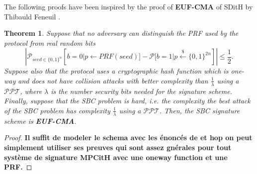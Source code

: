 \documentclass[english]{article}
\newtheorem{theorem}{Theorem}[section]
\begin{document}
	The following proofs have been inspired by the proof of \textbf{EUF-CMA} of SDitH by Thibauld Feneuil \cite{feneu2023}.
	
	\begin{theorem}
		Suppose that no adversary can distinguish the PRF used by the protocol from real random bits
		$$
		| \mathcal{P}_{seed \in \{0,1\}^n}[b=0 | p \leftarrow PRF(seed)] - \mathcal{P}[b=1 | p \overset{{\scriptscriptstyle\$}}{\leftarrow} \{0,1\}^{2n}] | \leq \frac{1}{2}.
		$$
		Suppose also that the protocol uses a cryptographic hash function which is one-way and does not have collision attacks with better complexity than $\frac{1}{\lambda}$ using a $\mathcal{PPT}$, where $\lambda$ is the number security bits needed for the signature scheme.
		Finally, suppose that the SBC problem is hard, i.e. the complexity the best attack of the SBC problem has complexity $\frac{1}{\lambda}$ using a $\mathcal{PPT}$.
		Then, the SBC signature scheme is \textbf{EUF-CMA}.
	\end{theorem}
	\begin{proof}
		\textbf{Il suffit de modeler le schema avec les énoncés de \cite{feneu2023} et hop on peut simplement utiliser ses preuves qui sont assez gnérales pour tout système de signature MPCitH avec une oneway function et une PRF.}
	\end{proof}
\end{document}
